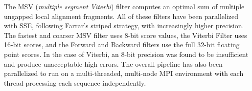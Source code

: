 The MSV (\emph{multiple segment Viterbi}) filter computes an optimal sum of multiple ungapped local alignment fragments. All of these filters have been parallelized with SSE, following Farrar's striped strategy, with increasingly higher precision. The fastest and coarser MSV filter uses 8-bit score values, the Viterbi Filter uses 16-bit scores, and the Forward and Backward filters use the full 32-bit floating point scores. In the case of Viterbi, an 8-bit precision was found to be insufficient and produce unacceptable high errors. The overall pipeline has also been parallelized to run on a multi-threaded, multi-node MPI environment with each thread processing each sequence independently.






\clearpage



